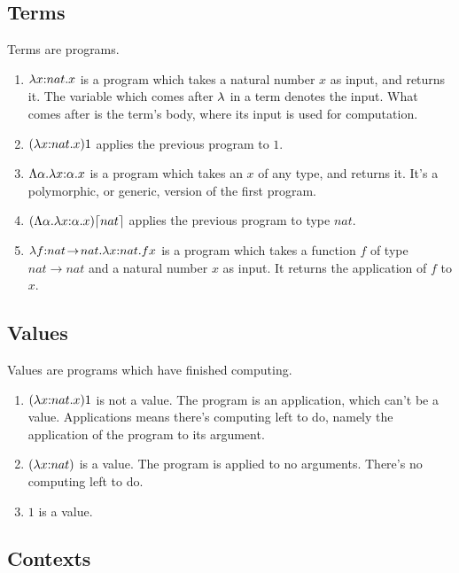\subsection{Terms}

Terms are programs.

\begin{enumerate}[label=\alph*)]
\item $\lambda x{:}nat.x$ is a program which takes a natural number $x$ as input, and returns it. The variable which comes after $\lambda$ in a term denotes the input. What comes after is the term's body, where its input is used for computation.
\item $(\lambda x{:}nat.x)1$ applies the previous program to $1$. 

\item $\Lambda\alpha.\lambda x{:}\alpha.x$ is a program which takes an $x$ of any type, and returns it. It's a polymorphic, or generic, version of the first program.
\item $(\Lambda\alpha.\lambda x{:}\alpha.x)\lceil nat\rceil$ applies the previous program to type $nat$. 

\item $\lambda f{:}nat\!\to\!nat.\lambda x{:}nat.fx$ is a program which takes a function $f$ of type $nat\!\to\!nat$ and a natural number $x$ as input. It returns the application of $f$ to $x$.  
\end{enumerate}



\subsection{Values}

Values are programs which have finished computing.
\begin{enumerate}[label=\alph*)]
\item $(\lambda x{:}nat.x)1$ is not a value. The program is an application, which can't be a value. Applications means there's computing left to do, namely the application of the program to its argument.  
\item $(\lambda x{:}nat)$ is a value. The program is applied to no arguments. There's no computing left to do.
\item $1$ is a value. 
\end{enumerate}

\subsection{Contexts}

